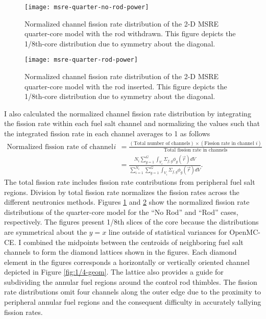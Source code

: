 \begin{figure}[p]
  \centering
  \texttt{[image: msre-quarter-no-rod-power]}
  \caption{Normalized channel fission rate distribution of the 2-D \gls{MSRE} quarter-core model
    with the rod withdrawn.
  This figure depicts the 1/8th-core distribution due to symmetry about the diagonal.}
  \label{fig:1/4-no-rod}
\end{figure}

\begin{figure}[p]
  \centering
  \texttt{[image: msre-quarter-rod-power]}
  \caption{Normalized channel fission rate distribution of the 2-D \gls{MSRE} quarter-core model
    with the rod inserted.
  This figure depicts the 1/8th-core distribution due to symmetry about the diagonal.}
  \label{fig:1/4-rod}
\end{figure}

\FloatBarrier

I also calculated the normalized channel fission rate distribution by integrating the fission rate
within each fuel salt channel and normalizing the values such that the integrated fission rate in
each channel averages to 1 as follows
%
\begin{align}
  \text{Normalized fission rate of channel }i &= \frac{(\text{Total number of channels})\times
    (\text{Fission rate in channel }i)}{\text{Total fission rate in channels}} \nonumber \\
                                              &= \frac{N_i\sum^G_{g=1}\int_{V_i}\Sigma_{f,g}
  \phi_g(\vec{r}) dV}{
  \sum^{N_i}_{i=1}\sum^G_{g=1}\int_{V_i}\Sigma_{f,g}\phi_g(\vec{r}) dV}.
\end{align}
%
The total fission rate includes fission rate contributions from peripheral fuel salt regions.
Division by total fission rate normalizes the fission rates across the different neutronics
methods.
Figures \ref{fig:1/4-no-rod} and \ref{fig:1/4-rod} show the normalized fission rate distributions
of the quarter-core model for the ``No Rod'' and ``Rod'' cases, respectively. The figures present
1/8th slices of the core because the distributions are symmetrical about the $y=x$ line
outside of statistical variances for OpenMC-CE. I combined the midpoints between the centroids of
neighboring fuel salt channels to form the diamond lattices shown in the figures.
Each diamond element in the figures corresponds a horizontally or vertically oriented channel
depicted in Figure \ref{fig:1/4-geom}. The lattice also provides a guide for subdividing the
annular fuel regions around the control rod thimbles. The fission rate
distributions omit four channels along the outer edge due to the proximity to peripheral annular
fuel regions and the consequent difficulty in accurately tallying fission rates.

